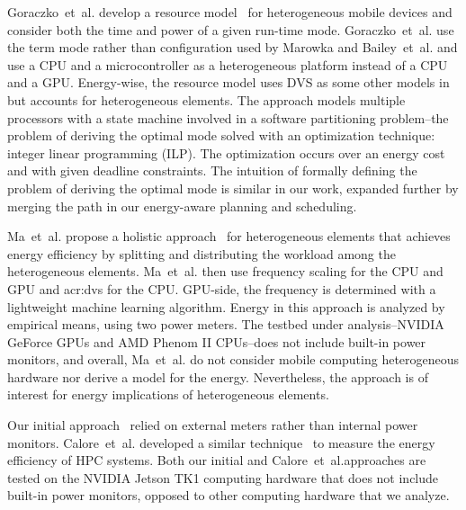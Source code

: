 Goraczko~et~al. develop a resource model~\citep{goraczko2008energy} for heterogeneous mobile devices and consider both the time and power of a given run-time mode. Goraczko~et~al. use the term mode rather than configuration used by Marowka and Bailey~et~al. and use a CPU and a microcontroller as a heterogeneous platform instead of a CPU and a GPU. Energy-wise, the resource model uses DVS as some other models in  but accounts for heterogeneous elements. The approach models multiple processors with a state machine involved in a software partitioning problem--the problem of deriving the optimal mode solved with an optimization technique: integer linear programming (ILP). The optimization occurs over an energy cost and with given deadline constraints. The intuition of formally defining the problem of deriving the optimal mode is similar in our work, expanded further by merging the path in our energy-aware planning and scheduling.

Ma~et~al. propose a holistic approach~\citep{ma2012holistic} for heterogeneous elements that achieves energy efficiency by splitting and distributing the workload among the heterogeneous elements. Ma~et~al. then use frequency scaling for the CPU and GPU and \Gls{acr:dvs} for the CPU. GPU-side, the frequency is determined with a lightweight machine learning algorithm. Energy in this approach is analyzed by empirical means, using two power meters. The testbed under analysis--NVIDIA GeForce GPUs and AMD Phenom II CPUs--does not include built-in power monitors, and overall, Ma~et~al. do not consider mobile computing heterogeneous hardware nor derive a model for the energy. Nevertheless, the approach is of interest for energy implications of heterogeneous elements.

Our initial approach~\citep{seewald2019hlpgpu} relied on external meters rather than internal power monitors. Calore~et~al. developed a similar technique~\citep{calore2015energy} to measure the energy efficiency of HPC systems. Both our initial and Calore~et~al.approaches are tested on the NVIDIA Jetson TK1 computing hardware that does not include built-in power monitors, opposed to other computing hardware that we analyze.

